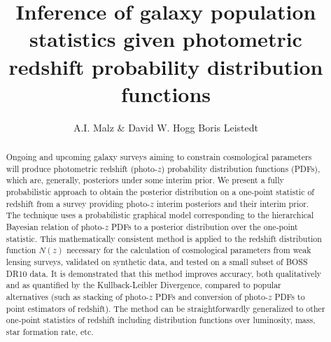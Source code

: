 \documentclass[preprint]{aastex}
\begin{document}
\title{Inference of galaxy population statistics given photometric redshift 
probability distribution functions}

\author{A.I. Malz \& David W. Hogg %
Boris Leistedt
}


\begin{abstract}
Ongoing and upcoming galaxy surveys aiming to constrain cosmological parameters 
will produce photometric redshift (photo-$z$) probability distribution 
functions (PDFs), which are, generally, posteriors under some interim prior.  
We present a fully probabilistic approach to obtain the posterior distribution 
on a one-point statistic of redshift from a survey providing photo-$z$ interim 
posteriors and their interim prior.  The technique uses a probabilistic 
graphical model corresponding to the hierarchical Bayesian relation of 
photo-$z$ PDFs to a posterior distribution over the one-point statistic.  This 
mathematically consistent method is applied to the redshift distribution 
function $N(z)$ necessary for the calculation of cosmological parameters from 
weak lensing surveys, validated on synthetic data, and tested on a small subset 
of BOSS DR10 data.  It is demonstrated that this method improves accuracy, both 
qualitatively and as quantified by the Kullback-Leibler Divergence, compared to 
popular alternatives (such as stacking of photo-$z$ PDFs and conversion of 
photo-$z$ PDFs to point estimators of redshift).  The method can be 
straightforwardly generalized to other one-point statistics of redshift 
including distribution functions over luminosity, mass, star formation rate, 
etc.
\end{abstract}

\end{document}
